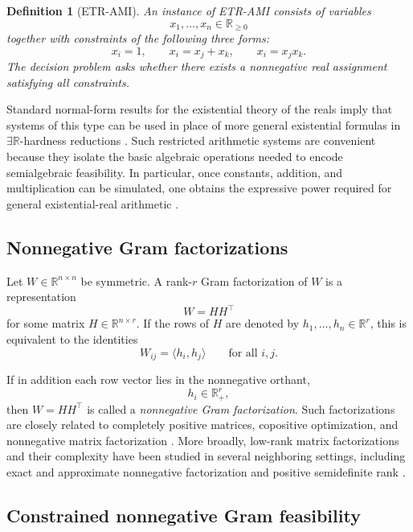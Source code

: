 \documentclass[11pt]{article}
\newtheorem{definition}[theorem]{Definition}
\begin{document}
\begin{definition}[ETR-AMI]
\label{def:etrami}
An instance of \textsc{ETR-AMI} consists of variables
\[
x_1,\dots,x_n \in \mathbb{R}_{\ge 0}
\]
together with constraints of the following three forms:
\[
x_i = 1,\qquad
x_i = x_j + x_k,\qquad
x_i = x_j x_k.
\]
The decision problem asks whether there exists a nonnegative real assignment
satisfying all constraints.
\end{definition}

Standard normal-form results for the existential theory of the reals imply
that systems of this type can be used in place of more general existential
formulas in $\exists\mathbb{R}$-hardness reductions
\cite{schaefer2010complexity,cardinal2013survey}. Such restricted arithmetic
systems are convenient because they isolate the basic algebraic operations
needed to encode semialgebraic feasibility. In particular, once constants,
addition, and multiplication can be simulated, one obtains the expressive
power required for general existential-real arithmetic
\cite{schaefer2010complexity,cardinal2013survey}.

\subsection{Nonnegative Gram factorizations}

Let $W \in \mathbb{R}^{n\times n}$ be symmetric. A rank-$r$ Gram factorization
of $W$ is a representation
\[
W = HH^\top
\]
for some matrix $H \in \mathbb{R}^{n\times r}$. If the rows of $H$ are denoted
by $h_1,\dots,h_n \in \mathbb{R}^r$, this is equivalent to the identities
\[
W_{ij} = \langle h_i,h_j\rangle
\qquad \text{for all } i,j.
\]

If in addition each row vector lies in the nonnegative orthant,
\[
h_i \in \mathbb{R}_+^r,
\]
then $W = HH^\top$ is called a \emph{nonnegative Gram factorization}. Such
factorizations are closely related to completely positive matrices, copositive
optimization, and nonnegative matrix factorization
\cite{berman2003cp,bomze2018copositive,cohen1993nonnegativerank,
laurent2015cp,vavasis2009complexity}. More broadly, low-rank matrix factorizations
and their complexity have been studied in several neighboring settings,
including exact and approximate nonnegative factorization and positive
semidefinite rank \cite{vavasis2009complexity,arora2012nmf,fawzi2015psdrank}.

\subsection{Constrained nonnegative Gram feasibility}
\end{document}
